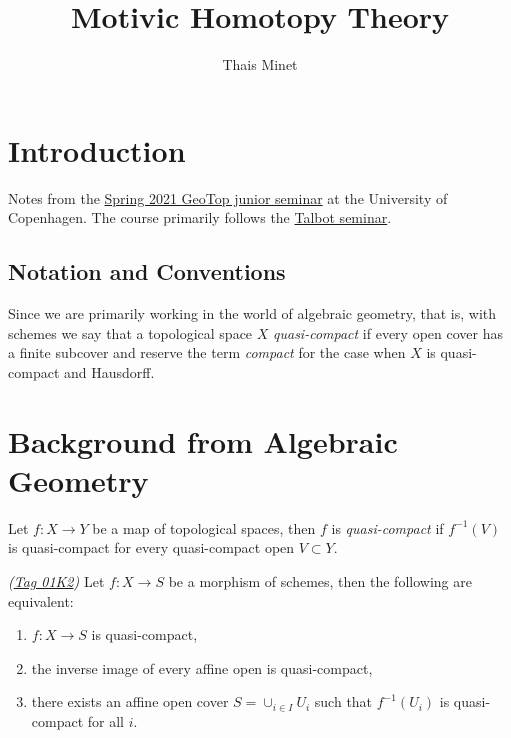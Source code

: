 \documentclass[12pt]{article}
\numberwithin{equation}{section}
\numberwithin{lemma}{section}
\numberwithin{theorem}{section}
\numberwithin{proposition}{section}
\numberwithin{corollary}{section}
\numberwithin{definition}{section}
\numberwithin{example}{section}
\numberwithin{remark}{section}
\newcommand{\name}{Thais Minet}
\newcommand{\thedate}{}
\newcommand{\course}{Motivic Homotopy Theory}
\newcommand{\assignment}{}
\begin{document}
\title{\course\\ \assignment}
\author{\name{}}
\date{\thedate}
\maketitle

\tableofcontents


\section*{Introduction}

Notes from the
\href{https://sites.google.com/view/maxime-ramzi-en/geotop-junior-seminar?authuser=0}{Spring
  2021 GeoTop junior seminar} at the University of Copenhagen. The
course primarily follows the
\href{https://math.mit.edu/events/talbot/index.php?year=2014}{Talbot
  seminar}.

\subsection*{Notation and Conventions}

Since we are primarily working in the world of algebraic geometry,
that is, with schemes we say that a topological space $X$
\emph{quasi-compact} if every open cover has a finite subcover and
reserve the term \emph{compact} for the case when $X$ is quasi-compact
and Hausdorff.

\section{Background from Algebraic Geometry}

\begin{definition}
  Let $f : X \to Y$ be a map of topological spaces, then $f$ is
  \emph{quasi-compact} if $f^{-1}(V)$ is quasi-compact for every
  quasi-compact open $V \subset Y$.
\end{definition}

\begin{lemma}{\emph{(\href{https://stacks.math.columbia.edu/tag/01K2}{Tag 01K2})}}
  Let $f : X \to S$ be a morphism of schemes, then the following are
  equivalent:
  \begin{enumerate}[label=(\arabic*)]
  \item $f : X \to S$ is quasi-compact,
  \item the inverse image of every affine open is quasi-compact,
  \item there exists an affine open cover $S = \cup_{i \in I} U_i$
    such that $f^{-1}(U_i)$ is quasi-compact for all $i$.
  \end{enumerate}
\end{lemma}
\end{document}
